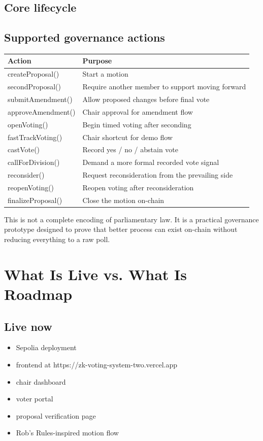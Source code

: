 \documentclass[12pt]{article}
\begin{document}
\subsection{Core lifecycle}

\noindent{}

\subsection{Supported governance actions}

\begin{tabular}{|p{}|p{}|}
\hline
\textbf{Action} & \textbf{Purpose} \\ \hline
createProposal() & Start a motion \\ \hline
secondProposal() & Require another member to support moving forward \\ \hline
submitAmendment() & Allow proposed changes before final vote \\ \hline
approveAmendment() & Chair approval for amendment flow \\ \hline
openVoting() & Begin timed voting after seconding \\ \hline
fastTrackVoting() & Chair shortcut for demo flow \\ \hline
castVote() & Record yes / no / abstain vote \\ \hline
callForDivision() & Demand a more formal recorded vote signal \\ \hline
reconsider() & Request reconsideration from the prevailing side \\ \hline
reopenVoting() & Reopen voting after reconsideration \\ \hline
finalizeProposal() & Close the motion on-chain \\ \hline
\end{tabular}

This is not a complete encoding of parliamentary law. It is a practical governance prototype designed to prove that better process can exist on-chain without reducing everything to a raw poll.

\section{What Is Live vs. What Is Roadmap}

\subsection{Live now}
\begin{itemize}
    \item Sepolia deployment
    \item frontend at https://zk-voting-system-two.vercel.app
    \item chair dashboard
    \item voter portal
    \item proposal verification page
    \item Rob's Rules-inspired motion flow
\end{itemize}
\end{document}
